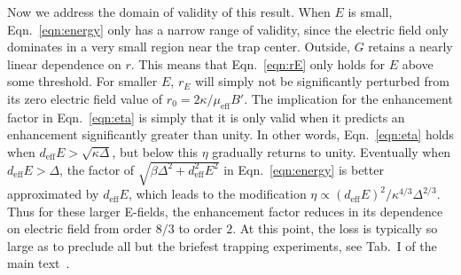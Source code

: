 \documentclass[%
 reprint,
 amsmath,amssymb,
 aps,
pra,
]{revtex4-1}
\begin{document}
Now we address the domain of validity of this result. 
When $E$ is small, Eqn.~\ref{eqn:energy} only has a narrow range of validity, since the electric field only dominates in a very small region near the trap center. 
Outside, $G$ retains a nearly linear dependence on $r$. 
This means that Eqn.~\ref{eqn:rE} only holds for $E$ above some threshold. 
For smaller $E$, $r_E$ will simply not be significantly perturbed from its zero electric field value of $r_0=2\kappa/\mu_\text{eff}B'$.
The implication for the enhancement factor in Eqn.~\ref{eqn:eta} is simply that it is only valid when it predicts an enhancement significantly greater than unity.
In other words, Eqn.~\ref{eqn:eta} holds when $d_\text{eff}E>\sqrt{\kappa\Delta}$, but below this $\eta$ gradually returns to unity.
Eventually when $d_\text{eff}E>\Delta$, the factor of $\sqrt{\beta\Delta^2+d_\text{eff}^2E^2}$ in Eqn.~\ref{eqn:energy} is better approximated by $d_\text{eff}E$, which leads to the modification $\eta\propto (d_\text{eff}E)^2/\kappa^{4/3}\Delta^{2/3}$. 
Thus for these larger E-fields, the enhancement factor reduces in its dependence on electric field from order $8/3$ to order $2$.
At this point, the loss is typically so large as to preclude all but the briefest trapping experiments, see Tab.~I of the main text~\cite{smt}.





\end{document}
